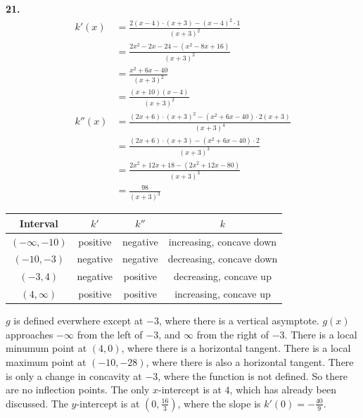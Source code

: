 \documentclass[10pt,oneside,]{book}
\theoremstyle{plain}
\theoremstyle{definition}
\numberwithin{equation}{section}
\newcommand{\fe}[2]{#1\mathopen{}\left(#2\right)\mathclose{}}
\newcommand{\ointerval}[2]{\left(#1,#2\right)}
\newcommand{\point}[2]{\left(#1,#2\right)}
\newcommand{\fd}[1]{#1'}
\newcommand{\sd}[1]{#1''}
\begin{document}
\par\smallskip
\noindent\textbf{21.}\quad{}\begin{align*}
\fe{\fd{k}}{x}&=\frac{2(x-4)\cdot(x+3)-(x-4)^2\cdot1}{(x+3)^2}\\
&=\frac{2x^2-2x-24-(x^2-8x+16)}{(x+3)^2}\\
&=\frac{x^2+6x-40}{(x+3)^2}\\
&=\frac{(x+10)(x-4)}{(x+3)^2}\\
\fe{\sd{k}}{x}&=\frac{(2x+6)\cdot(x+3)^2-\left(x^2+6x-40\right)\cdot2(x+3)}{(x+3)^4}\\
&=\frac{(2x+6)\cdot(x+3)-\left(x^2+6x-40\right)\cdot2}{(x+3)^3}\\
&=\frac{2x^2+12x+18-\left(2x^2+12x-80\right)}{(x+3)^3}\\
&=\frac{98}{(x+3)^3}
\end{align*}%
\begin{tabular}{cccc}
\toprule
Interval&\(\fd{k}\)&\(\sd{k}\)&\(k\)\\
\midrule
\(\ointerval{-\infty}{-10}\)&positive&negative&increasing, concave down\\
\midrule
\(\ointerval{-10}{-3}\)&negative&negative&decreasing, concave down\\
\midrule
\(\ointerval{-3}{4}\)&negative&positive&decreasing, concave up\\
\midrule
\(\ointerval{4}{\infty}\)&positive&positive&increasing, concave up\\
\midrule
\end{tabular}
\par
\(g\) is defined everwhere except at \(-3\), where there is a vertical asymptote. \(\fe{g}{x}\) approaches \(-\infty\) from the left of \(-3\), and \(\infty\) from the right of \(-3\). There is a local minumum point at \(\point{4}{0}\), where there is a horizontal tangent. There is a local maximum point at \(\point{-10}{-28}\), where there is also a horizontal tangent. There is only a change in concavity at \(-3\), where the function is not defined. So there are no inflection points. The only \(x\)-intercept is at \(4\), which has already been discussed. The \(y\)-intercept is at \(\point{0}{\frac{16}{3}}\), where the slope is \(\fe{\fd{k}}{0}=-\frac{40}{9}\).%
{
}
\par\smallskip
\end{document}
